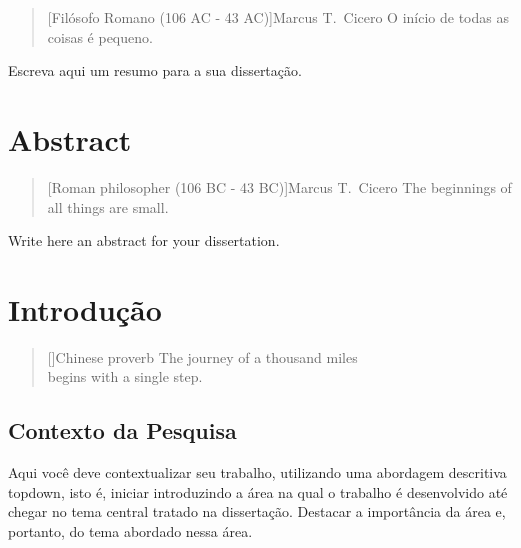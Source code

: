 \documentclass[final]{rc-book-2.14}
\begin{document}
\begin{quotation}[Filósofo Romano (106 AC - 43 AC)]{Marcus T.~Cicero}
    O início de todas as coisas é pequeno.
\end{quotation}


\begin{otherlanguage}{portuguese}
    \drop Escreva aqui um resumo para a sua dissertação.
\end{otherlanguage}


\chapter{Abstract}
\label{chp:general-abstract:english}


\begin{quotation}[Roman philosopher (106 BC - 43 BC)]{Marcus T.~Cicero}
    The beginnings of all things are small.
\end{quotation}

\drop Write here an abstract for your dissertation.

\mainmatter


\chapter{Introdução}
\label{chp:introduction}

\begin{quotation}[]{Chinese proverb}
    The journey of a thousand miles \\ begins with a single step.
\end{quotation}


\section{Contexto da Pesquisa}
\label{sec:introduction:context}

Aqui você deve contextualizar seu trabalho, utilizando uma abordagem descritiva topdown, isto é, iniciar introduzindo a área na qual o trabalho é desenvolvido até chegar no tema central tratado na dissertação. Destacar a importância da área e, portanto, do tema abordado nessa área.
\end{document}
